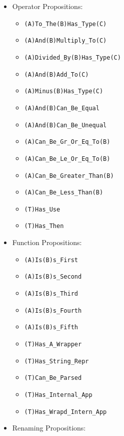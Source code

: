 \documentclass{article}
\begin{document}
\begin{itemize}

\item Operator Propositions:

  \begin{itemize}
  \item \texttt{(A)To_The(B)Has_Type(C)}
  \item \texttt{(A)And(B)Multiply_To(C)}
  \item \texttt{(A)Divided_By(B)Has_Type(C)}
  \item \texttt{(A)And(B)Add_To(C)}
  \item \texttt{(A)Minus(B)Has_Type(C)}
  \item \texttt{(A)And(B)Can_Be_Equal}
  \item \texttt{(A)And(B)Can_Be_Unequal}
  \item \texttt{(A)Can_Be_Gr_Or_Eq_To(B)}
  \item \texttt{(A)Can_Be_Le_Or_Eq_To(B)}
  \item \texttt{(A)Can_Be_Greater_Than(B)}
  \item \texttt{(A)Can_Be_Less_Than(B)}
  \item \texttt{(T)Has_Use}
  \item \texttt{(T)Has_Then}
  \end{itemize}

\item Function Propositions:

  \begin{itemize}
  \item \texttt{(A)Is(B)s_First}
  \item \texttt{(A)Is(B)s_Second}
  \item \texttt{(A)Is(B)s_Third}
  \item \texttt{(A)Is(B)s_Fourth}
  \item \texttt{(A)Is(B)s_Fifth}
  \item \texttt{(T)Has_A_Wrapper}
  \item \texttt{(T)Has_String_Repr}
  \item \texttt{(T)Can_Be_Parsed}
  \item \texttt{(T)Has_Internal_App}
  \item \texttt{(T)Has_Wrapd_Intern_App}
  \end{itemize}

\item Renaming Propositions:


\end{itemize}
\end{document}

